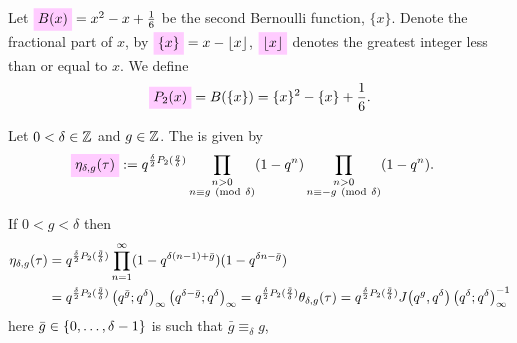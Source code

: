 \documentclass{article}
\begin{document}
Let $\defineNotation[B]{B(x)} = x^2 - x + \frac{1}{6}$
be the second Bernoulli function, $\{x\}$.
%
Denote the fractional part of $x$, by
$\defineNotation[x-fractional]{\{x\}} = x - \lfloor x \rfloor$,
$\defineNotation[x-floor]{\lfloor x \rfloor}$ denotes the greatest
integer less than or equal to $x$.
We define
\begin{gather}
    \defineNotation[P-2]{P_2(x)} = B(\{x\}) = \{x\}^2 - \{x\} + \frac{1}{6}.
    \label{eq:P-2}
\end{gather}

\begin{Definition}
\label{def:eta_delta-g^[R](tau)}
\cite{Robins_GeneralizedDedekindEtaProducts_1994}
%
Let $0<\delta\in\mathbb{Z}$ and $g\in\mathbb{Z}$.
%
The  is given by
\begin{align}
  \defineNotation[eta-delta-g-tau-Robins]{\eta_{\delta,g}(\tau)}
  &:=
  q^{\frac{\delta}{2}P_2(\frac{g}{\delta})}
  \prod_{\substack{n>0\\n\equiv g\ (\mathrm{mod}\ \delta)}} (1-q^n)
  \prod_{\substack{n>0\\n\equiv -g\ (\mathrm{mod}\ \delta)}} (1-q^n).
  \label{eq:eta_delta-g^[R](tau)-mod}
\end{align}

\begin{AdditionalInformation}
If $0<g<\delta$ then
\begin{align}
  \eta_{\delta,g}(\tau)
  &=
  q^{\frac{\delta}{2}P_2(\frac{\bar{g}}{\delta})}
  \prod_{n=1}^\infty (1-q^{\delta (n-1)+\bar{g}})(1-q^{\delta n-\bar{g}})
  \notag\\
  &=
  q^{\frac{\delta}{2}P_2(\frac{\bar{g}}{\delta})}
  \left( q^{\bar{g}};q^\delta \right)_{\infty} \left( q^{\delta-\bar{g}};q^\delta \right)_{\infty}
  =
  q^{\frac{\delta}{2}P_2(\frac{\bar{g}}{\delta})}
  \theta_{\delta,g}(\tau)
  =
  q^{\frac{\delta}{2}P_2(\frac{\bar{g}}{\delta})}
  J\!\left(q^g,q^\delta\right) \left( {q}^{\delta};{q}^{\delta} \right)_{\infty}^{-1}
  \label{eq:eta_delta-g^[R](tau)}
\end{align}
here $\bar{g}\in\left\{0,\ldots,\delta-1\right\}$ is such that
$\bar{g} \equiv_\delta g$,
\end{AdditionalInformation}
\end{Definition}
\end{document}
